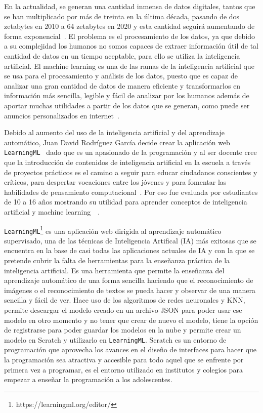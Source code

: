 \documentclass[a4paper, 12pt]{book}
\begin{document}
En la actualidad, se generan una cantidad inmensa de datos digitales, tantos que se han multiplicado por más de treinta en la última década, pasando de dos zetabytes en 2010 a 64 zetabytes en 2020 y esta cantidad seguirá aumentando de forma exponencial~\cite{Pagina_de_Datos}. 
El problema es el procesamiento de los datos, ya que debido a su complejidad los humanos no somos capaces de extraer información útil de tal cantidad de datos en un tiempo aceptable, para ello se utiliza la inteligencia artificial. 
El machine learning es una de las ramas de la inteligencia artificial que se usa para el procesamiento y análisis de los datos, puesto que es capaz de analizar una gran cantidad de datos de manera eficiente y transformarlos en información más sencilla, legible y fácil de analizar por los humanos además de aportar muchas utilidades a partir de los datos que se generan, como puede ser anuncios personalizados en internet~\cite{rouhiainen2018inteligencia}.

Debido al aumento del uso de la inteligencia artificial y del aprendizaje automático, Juan David Rodríguez García decide crear la aplicación web \texttt{LearningML}~\cite{garcia2020learningml} dado que es un apasionado de la programación y al ser docente cree  que la introducción de contenidos de inteligencia artificial en la escuela a través de proyectos prácticos es el camino a seguir para educar ciudadanos conscientes y críticos, para despertar vocaciones entre los jóvenes y para fomentar las habilidades de pensamiento computacional~\cite{garcia2019developing}. Por eso fue evaluada por estudiantes de 10 a 16 años mostrando su utilidad para aprender conceptos de inteligencia artificial y machine learning~\cite{Pagina_de_LearningML}~\cite{rodriguez2021evaluation}.

\texttt{LearningML}\footnote{https://learningml.org/editor/} es una aplicación web dirigida al aprendizaje automático supervisado, una de las técnicas de Inteligencia Artifical (IA) más exitosas que se encuentra en la base de casi todas las aplicaciones actuales de IA y con la que se pretende cubrir la falta de herramientas para la enseñanza práctica de la inteligencia artificial. 
Es una herramienta que permite la enseñanza del aprendizaje automático de una forma sencilla haciendo que el reconocimiento de imágenes o el reconocimiento de textos se pueda hacer y observar de una manera sencilla y fácil de ver. 
Hace uso de los algoritmos de redes neuronales y KNN, permite descargar el modelo creado en un archivo JSON para poder usar ese modelo en otro momento y no tener que crear de nuevo el modelo, tiene la opción de registrarse para poder guardar los modelos en la nube y permite crear un modelo en Scratch y utilizarlo en \texttt{LearningML}. Scratch es un entorno de programación que aprovecha los avances en el diseño de interfaces para hacer que la programación sea atractiva y accesible para todo aquel que se enfrente por primera vez a programar, es el entorno utilizado en institutos y colegios para empezar a enseñar la programación a los adolescentes.
\end{document}
